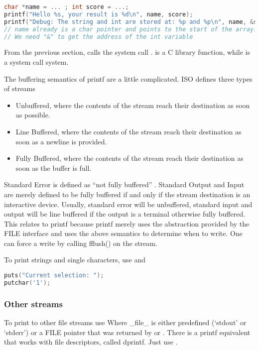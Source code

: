 \begin{lstlisting}[language=C]
char *name = ... ; int score = ...;
printf("Hello %s, your result is %d\n", name, score);
printf("Debug: The string and int are stored at: %p and %p\n", name, &score );
// name already is a char pointer and points to the start of the array.
// We need "&" to get the address of the int variable
\end{lstlisting}

From the previous section,
 calls the system call .
 is a C library function, while  is a system call system.

The buffering semantics of printf are a little complicated.
ISO defines three types of streams \cite[P. 278]{ISON1124}
\begin{itemize}
\item Unbuffered, where the contents of the stream reach their destination as soon as possible.
\item Line Buffered, where the contents of the stream reach their destination as soon as a newline is provided.
\item Fully Buffered, where the contents of the stream reach their destination as soon as the buffer is full.
\end{itemize}

Standard Error is defined as ``not fully buffered'' \cite[P. 279]{ISON1124}.
Standard Output and Input are merely defined to be fully buffered if and only if the stream destination is an interactive device.
Usually, standard error will be unbuffered, standard input and output will be line buffered if the output is a terminal otherwise fully buffered.
This relates to printf because printf merely uses the abstraction provided by the FILE interface and uses the above semantics to determine when to write.
One can force a write by calling fflush() on the stream.

To print strings and single characters, use  and 

\begin{lstlisting}[language=C]
puts("Current selection: ");
putchar('1');
\end{lstlisting}

\subsubsection{Other streams}

To print to other file streams use  Where \_file\_ is either predefined (`stdout' or `stderr') or a FILE pointer that was returned by  or .
There is a printf equivalent that works with file descriptors, called dprintf.
Just use .

